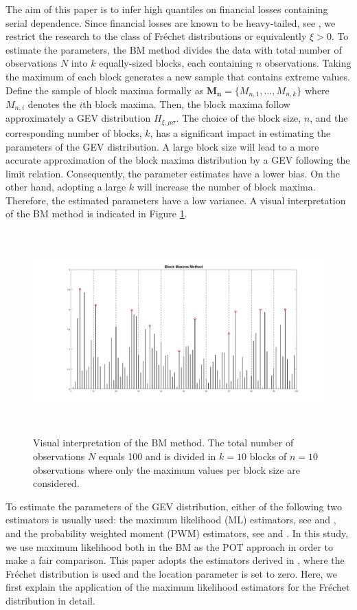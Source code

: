 \documentclass[a4paper,12pt]{article}
\theoremstyle{plain}
\begin{document}
The aim of this paper is to infer high quantiles on financial losses containing serial dependence. Since financial losses are known to be heavy-tailed, see , we restrict the research to the class of Fr\'echet distributions or equivalently $\xi>0$. To estimate the parameters, the BM method divides the data with total number of observations $N$ into $k$ equally-sized blocks, each containing $n$ observations. Taking the maximum of each block generates a new sample that contains extreme values. Define the sample of block maxima formally as $\bm{M_n}=\{M_{n,1}, \dots, M_{n,k}\}$ where $M_{n,i}$ denotes the $i$th block maxima. Then, the block maxima follow approximately a GEV distribution $H_{\xi,\mu\sigma}$. The choice of the block size, $n$, and the corresponding number of blocks, $k$, has a significant impact in estimating the parameters of the GEV distribution. A large block size will lead to a more accurate approximation of the block maxima distribution by a GEV following the limit relation. Consequently, the parameter estimates have a lower bias. On the other hand, adopting a large $k$ will increase the number of block maxima. Therefore, the estimated parameters have a low variance. A visual interpretation of the BM method is indicated in Figure \ref{fig:blockmaxima}.

\begin{figure}[H]
\includegraphics[height=7.8cm, width=\linewidth]{Figures/blockmaxima_example2.jpg} 
\caption{Visual interpretation of the BM method. The total number of observations $N$ equals 100 and is divided in $k=10$ blocks of $n=10$ observations where only the maximum values per block size are considered.}
\label{fig:blockmaxima}
\end{figure}

To estimate the parameters of the GEV distribution, either of the following two estimators is usually used: the maximum likelihood (ML) estimators, see  and , and the probability weighted moment (PWM) estimators, see  and . In this study, we use maximum likelihood both in the BM as the POT approach in order to make a fair comparison. This paper adopts the estimators derived in , where the Fr\'echet distribution is used and the location parameter is set to zero. Here, we first explain the application of the maximum likelihood estimators for the Fr\'echet distribution in detail. \\
\end{document}

